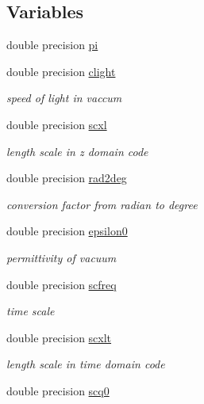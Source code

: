 \subsection*{Variables}
\begin{DoxyCompactItemize}
\item 
double precision \mbox{\hyperlink{namespacephysconstclass_a78e5b579cf4c062c45ae0f9922355783}{pi}}
\item 
double precision \mbox{\hyperlink{namespacephysconstclass_a8622c3bd03bb3706b061386b694c8f71}{clight}}
\begin{DoxyCompactList}\small\item\em speed of light in vaccum \end{DoxyCompactList}\item 
double precision \mbox{\hyperlink{namespacephysconstclass_af2c99b666d1986d824837a37dd85cd50}{scxl}}
\begin{DoxyCompactList}\small\item\em length scale in z domain code \end{DoxyCompactList}\item 
double precision \mbox{\hyperlink{namespacephysconstclass_a1f59be9127e8be0b50b2f15277976fb2}{rad2deg}}
\begin{DoxyCompactList}\small\item\em conversion factor from radian to degree \end{DoxyCompactList}\item 
double precision \mbox{\hyperlink{namespacephysconstclass_affe5679370336ffdace4ff9f095211f9}{epsilon0}}
\begin{DoxyCompactList}\small\item\em permittivity of vacuum \end{DoxyCompactList}\item 
double precision \mbox{\hyperlink{namespacephysconstclass_a72551429ee6cdefac23bdaafc09bb169}{scfreq}}
\begin{DoxyCompactList}\small\item\em time scale \end{DoxyCompactList}\item 
double precision \mbox{\hyperlink{namespacephysconstclass_a32381ca7ccc85dd961e4540f5e6c44fd}{scxlt}}
\begin{DoxyCompactList}\small\item\em length scale in time domain code \end{DoxyCompactList}\item 
double precision \mbox{\hyperlink{namespacephysconstclass_ad43d82a4ecebf026bbb5c900d378b625}{scq0}}

\end{DoxyCompactItemize}
